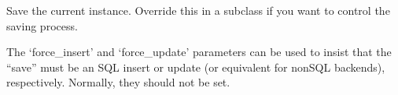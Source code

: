 \documentclass[letterpaper,10pt,english]{sphinxmanual}
\begin{document}
\begin{fulllineitems}
\begin{fulllineitems}
\end{fulllineitems}


\begin{fulllineitems}
\label{\detokenize{source/api:api.models.TextUpload.save}}
\pysigstartsignatures
{}
\pysigstopsignatures
\sphinxAtStartPar
Save the current instance. Override this in a subclass if you want to
control the saving process.

\sphinxAtStartPar
The ‘force\_insert’ and ‘force\_update’ parameters can be used to insist
that the “save” must be an SQL insert or update (or equivalent for
non\sphinxhyphen{}SQL backends), respectively. Normally, they should not be set.

\end{fulllineitems}


\end{fulllineitems}

\end{document}
